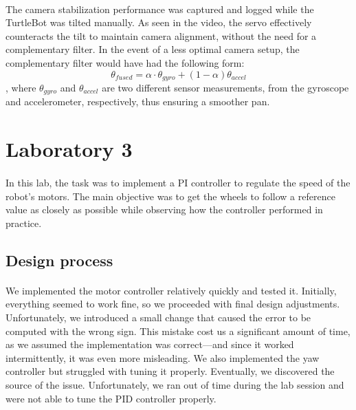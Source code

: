 \documentclass[english]{article}
\begin{document}
    \paragraph{}
    The camera stabilization performance was captured and logged while the TurtleBot was tilted manually. As seen in the video, the servo effectively counteracts the tilt to maintain camera alignment, without the need for a complementary filter. In the event of a less optimal camera setup, the complementary filter would have had the following form:
    \begin{equation}
        \theta_{fused} = \alpha \cdot\theta_{gyro} + (1 - \alpha) \theta_{accel}
    \end{equation},
    where $\theta_{gyro}$ and $\theta_{accel}$ are two different sensor measurements, from the gyroscope and accelerometer, respectively, thus ensuring a smoother pan.
    


\section{Laboratory 3}
         \paragraph{}
            In this lab, the task was to implement a PI controller to regulate the speed of the robot’s motors. The main objective was to get the wheels to follow a reference value as closely as possible while observing how the controller performed in practice.
		\subsection{Design process}
			\paragraph{}
			We implemented the motor controller relatively quickly and tested it. 
			Initially, everything seemed to work fine, so we proceeded with final design adjustments. 
			Unfortunately, we introduced a small change that caused the error to be computed with the
			wrong sign. This mistake cost us a significant amount of time, as we assumed the 
			implementation was correct—and since it worked intermittently, it was even more misleading. 
			We also implemented the yaw controller but struggled with tuning it properly. 
			Eventually, we discovered the source of the issue. 
			Unfortunately, we ran out of time during the lab session and were not able to tune the PID controller properly.
\end{document}
